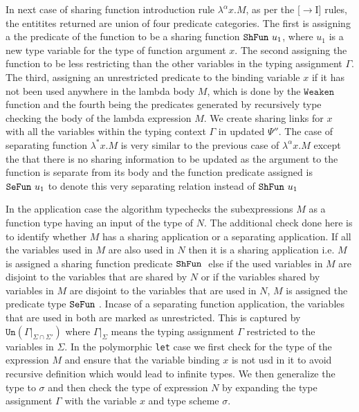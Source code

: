 In next case of sharing function introduction rule $\lambda^{\alpha}x.M$, as per the [$\rightarrow$I] rules, the entitites returned
are union of four predicate categories. The first is assigning a the predicate of the function to be
a sharing function $\texttt{ShFun}\ u_1$, where $u_1$ is a new type variable for the type of function argument $x$.
The second assigning the function to be less restricting than the other variables in the typing assignment $\Gamma$.
The third, assigning an unrestricted predicate to the binding variable $x$ if it has not been used
anywhere in the lambda body $M$, which is done by the $\texttt{Weaken}$ function and the fourth
being the predicates generated by recursively type checking the body of the lambda expression $M$.
We create sharing links for $x$ with all the variables within the typing context $\Gamma$ in updated
$\Psi''$.
The case of separating function $\lambda^{*}x. M$ is very similar to the previous case of $\lambda^{\alpha}x. M$ except
the that there is no sharing information to be updated as the argument to the function is
separate from its body and the function predicate assigned is $\texttt{SeFun}\ u_1$ to denote this very
separating relation instead of $\texttt{ShFun}\ u_1$

In the application case the algorithm typechecks the subexpressions $M$ as a function type having
an input of the type of $N$. The additional check done here is to identify whether $M$ has a sharing
application or a separating application. If all the variables used in $M$ are also used in $N$ then
it is a sharing application i.e. $M$ is assigned a sharing function predicate $\texttt{ShFun}\ $
else if the used variables in $M$ are disjoint to the variables that
are shared by $N$ or if the variables shared by variables in $M$ are disjoint to the variables
that are used in $N$, $M$ is assigned the predicate type $\texttt{SeFun}\ $. Incase of a separating function
application, the variables that are used in both are marked as unrestricted. This is captured by
$\texttt{Un}(\Gamma|_{\Sigma \cap \Sigma'})$ where $\Gamma|_{\Sigma}$ means the typing assignment $\Gamma$
restricted to the variables in $\Sigma$.
In the polymorphic \texttt{let} case we first check for the type of the expression $M$ and
ensure that the variable binding $x$ is not usd in it to avoid recursive definition which would
lead to infinite types. We then generalize the type to $\sigma$ and then check the type of expression $N$
by expanding the type assignment $\Gamma$ with the variable $x$ and type scheme $\sigma$.

